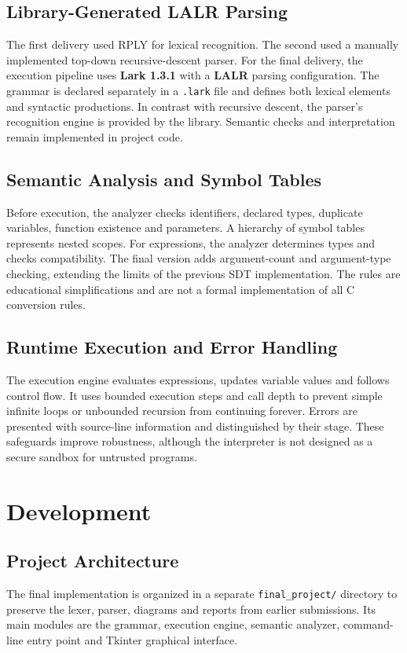 \documentclass[letterpaper,12pt,oneside]{article}
\begin{document}
\subsection{Library-Generated LALR Parsing}
The first delivery used RPLY for lexical recognition. The second used a manually implemented top-down recursive-descent parser. For the final delivery, the execution pipeline uses \textbf{Lark 1.3.1} with a \textbf{LALR} parsing configuration. The grammar is declared separately in a \texttt{.lark} file and defines both lexical elements and syntactic productions. In contrast with recursive descent, the parser's recognition engine is provided by the library. Semantic checks and interpretation remain implemented in project code.

\subsection{Semantic Analysis and Symbol Tables}
Before execution, the analyzer checks identifiers, declared types, duplicate variables, function existence and parameters. A hierarchy of symbol tables represents nested scopes. For expressions, the analyzer determines types and checks compatibility. The final version adds argument-count and argument-type checking, extending the limits of the previous SDT implementation. The rules are educational simplifications and are not a formal implementation of all C conversion rules.

\subsection{Runtime Execution and Error Handling}
The execution engine evaluates expressions, updates variable values and follows control flow. It uses bounded execution steps and call depth to prevent simple infinite loops or unbounded recursion from continuing forever. Errors are presented with source-line information and distinguished by their stage. These safeguards improve robustness, although the interpreter is not designed as a secure sandbox for untrusted programs.

\section{Development}
\subsection{Project Architecture}
The final implementation is organized in a separate \texttt{final\_project/} directory to preserve the lexer, parser, diagrams and reports from earlier submissions. Its main modules are the grammar, execution engine, semantic analyzer, command-line entry point and Tkinter graphical interface.
\end{document}
